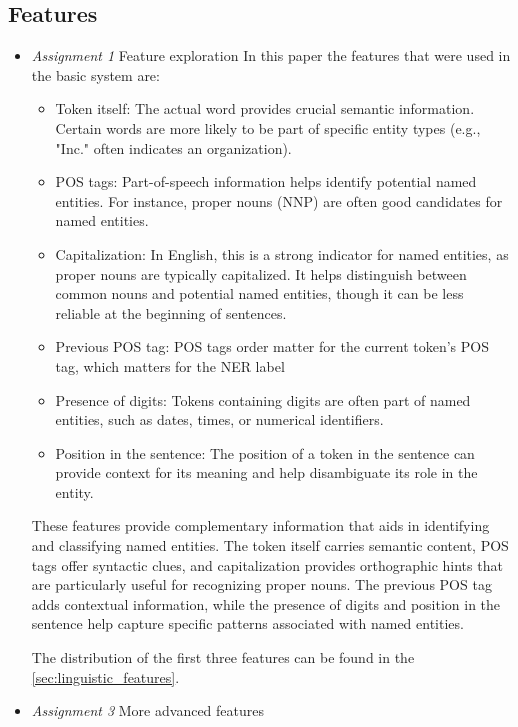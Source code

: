 \documentclass[11pt]{article}
\begin{document}
\subsection{Features}

\begin{itemize}
    \item[] \textit{Assignment 1} Feature exploration
          In this paper the features that were used in the basic system are:
          \begin{itemize}
              \item Token itself: The actual word provides crucial semantic information. Certain words are more likely to be part of specific entity types (e.g., "Inc." often indicates an organization).
              \item POS tags: Part-of-speech information helps identify potential named entities. For instance, proper nouns (NNP) are often good candidates for named entities.
              \item Capitalization: In English, this is a strong indicator for named entities, as proper nouns are typically capitalized. It helps distinguish between common nouns and potential named entities, though it can be less reliable at the beginning of sentences.
              \item Previous POS tag: POS tags order matter for the current token's POS tag, which matters for the NER label
              \item Presence of digits: Tokens containing digits are often part of named entities, such as dates, times, or numerical identifiers.
              \item Position in the sentence: The position of a token in the sentence can provide context for its meaning and help disambiguate its role in the entity.
          \end{itemize}
          These features provide complementary information that aids in identifying and classifying named entities.
          The token itself carries semantic content, POS tags offer syntactic clues, and capitalization provides orthographic hints that are particularly useful for recognizing proper nouns.
          The previous POS tag adds contextual information, while the presence of digits and position in the sentence help capture specific patterns associated with named entities.

          The distribution of the first three features can be found in the \ref{sec:linguistic_features}.
    \item[] \textit{Assignment 3} More advanced features
\end{itemize}
\end{document}
